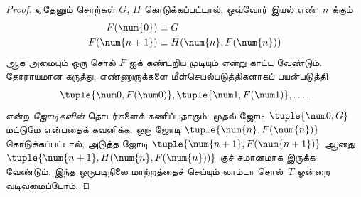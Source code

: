 \documentclass[../../../include/open-logic-section]{subfiles}
\begin{document}
\begin{proof}
ஏதேனும் சொற்கள் $G$, $H$ கொடுக்கப்பட்டால், ஒவ்வோர் இயல் எண்~$n$ க்கும்
\begin{align*}
F(\num{0}) & \equiv G \\
F(\num{n+1}) & \equiv H(\num{n}, F(\num{n}))
\end{align*}
ஆக அமையும் ஒரு சொல் $F$ ஐக் கண்டறிய முடியும் என்று காட்ட வேண்டும். தோராயமான
கருத்து, எண்ணுருக்களை மீள்செயல்படுத்திகளாகப் பயன்படுத்தி
\[
\tuple{\num 0, F(\num 0)}, \tuple{\num 1, F(\num 1)}, \dots,
\]
என்ற \emph{ஜோடிகளின்} தொடர்களைக் கணிப்பதாகும். முதல் ஜோடி
$\tuple{\num 0, G}$ மட்டுமே என்பதைக் கவனிக்க. ஒரு ஜோடி
$\tuple{\num{n}, F(\num{n})}$ கொடுக்கப்பட்டால், அடுத்த ஜோடி
$\tuple{\num{n+1}, F(\num{n+1})}$ ஆனது
$\tuple{\num{n+1}, H(\num{n}, F(\num{n}))}$ குச் சமானமாக இருக்க வேண்டும்.
இந்த ஒருபடிநிலை மாற்றத்தைச் செய்யும் லாம்டா சொல்~$T$ ஒன்றை வடிவமைப்போம்.


\end{proof}
\end{document}
